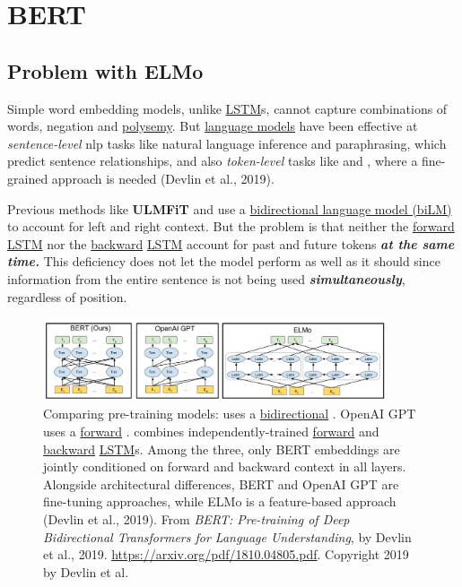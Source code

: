 \section{BERT} \label{sec:BERT}

\subsection{Problem with ELMo} \label{sec:ProblemWithELMo}

Simple word embedding models, unlike \hyperref[sec:LSTM]{LSTM}s, cannot capture combinations of words, negation and \hyperref[sec:Polysemy]{polysemy}. But \hyperref[sec:LanguageModels]{language models} have been effective at \emph{sentence-level} nlp tasks like natural language inference and paraphrasing, which predict sentence relationships, and also \emph{token-level} tasks like  and , where a fine-grained approach is needed (Devlin et al., 2019).   

Previous methods like \textbf{ULMFiT} and  use a \hyperref[sec:BidirectionalLM]{bidirectional language model (biLM)} to account for left and right context. But the problem is that neither the \hyperref[sec:ForwardLM]{forward} \hyperref[sec:LSTM]{LSTM} nor the \hyperref[sec:BackwardLM]{backward} \hyperref[sec:LSTM]{LSTM} account for past and future tokens \textbf{\textit{at the same time.}} This deficiency does not let the model perform as well as it should since information from the entire sentence is not being used \textbf{\textit{simultaneously}}, regardless of position. 


\begin{figure}[h]
\vspace{-5pt}
\centering
\includegraphics[width=0.9\textwidth]{imgs/bert_vs_elmo_vs_gpt.png}
\vspace{-5pt}
\caption{\footnotesize Comparing pre-training models:  uses a \hyperref[sec:BidirectionalLM]{bidirectional} . OpenAI GPT uses a \hyperref[sec:ForwardLM]{forward} .  combines independently-trained \hyperref[sec:ForwardLM]{forward} and \hyperref[sec:BackwardLM]{backward} \hyperref[sec:LSTM]{LSTM}s. Among the three, only BERT embeddings are jointly conditioned on forward and backward context in all layers. Alongside architectural differences, BERT and OpenAI GPT are fine-tuning approaches, while ELMo is a feature-based approach (Devlin et al., 2019). From \emph{BERT: Pre-training of Deep Bidirectional Transformers for Language Understanding}, by Devlin et al., 2019. \url{https://arxiv.org/pdf/1810.04805.pdf}. Copyright 2019 by Devlin et al.}
\vspace{-5pt}
\label{fig:NAME}
\end{figure}





